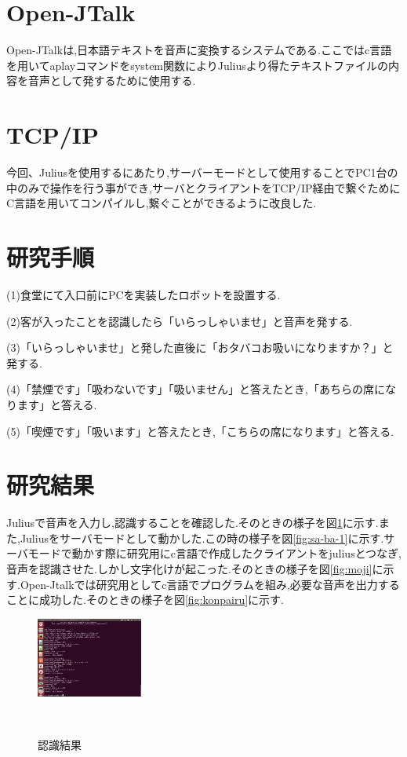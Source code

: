 \documentclass[a4paper]{jarticle}
\begin{document}
\section{Open-JTalk}
Open-JTalkは,日本語テキストを音声に変換するシステムである.ここではc言語を用いてaplayコマンドをsystem関数によりJuliusより得たテキストファイルの内容を音声として発するために使用する.


\section{TCP/IP}
今回、Juliusを使用するにあたり,サーバーモードとして使用することでPC1台の中のみで操作を行う事ができ,サーバとクライアントをTCP/IP経由で繋ぐためにC言語を用いてコンパイルし,繋ぐことができるように改良した.


\section{研究手順}
(1)食堂にて入口前にPCを実装したロボットを設置する.


(2)客が入ったことを認識したら「いらっしゃいませ」と音声を発する.


(3)「いらっしゃいませ」と発した直後に「おタバコお吸いになりますか？」と発する.


(4)「禁煙です」「吸わないです」「吸いません」と答えたとき,「あちらの席になります」と答える.


(5)「喫煙です」「吸います」と答えたとき,「こちらの席になります」と答える.


\section{研究結果}
Juliusで音声を入力し,認識することを確認した.そのときの様子を図\ref{fig:ninshiki}に示す.また,Juliusをサーバモードとして動かした.この時の様子を図\ref{fig:sa-ba-1}に示す.サーバモードで動かす際に研究用にc言語で作成したクライアントをjuliusとつなぎ,音声を認識させた.しかし文字化けが起こった.そのときの様子を図\ref{fig:moji}に示す.Open-Jtalkでは研究用としてc言語でプログラムを組み,必要な音声を出力することに成功した.そのときの様子を図\ref{fig:konpairu}に示す.


\begin{figure}[h]
 \begin{center}
  \includegraphics[width=35mm]{img/ninshiki.png}
 　\caption{認識結果}
 　\label{fig:ninshiki}
 \end{center}
\end{figure}
\end{document}
